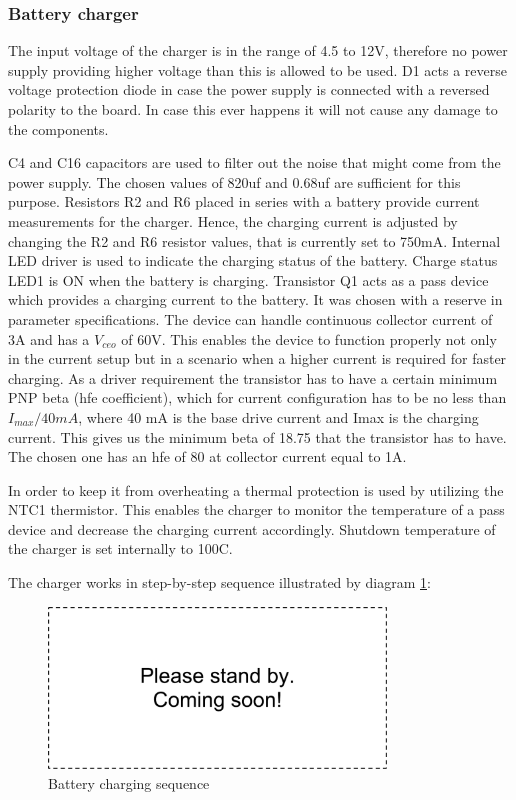 \subsubsection{Battery charger}
The input voltage of the charger is in the range of 4.5 to 12V, therefore no power supply providing higher voltage than this is allowed to be used. D1 acts a reverse voltage protection diode in case the power supply is connected with a reversed polarity to the board. In case this ever happens it will not cause any damage to the components. 


C4 and C16 capacitors are used to filter out the noise that might come from the power supply. The chosen values of 820uf and 0.68uf are sufficient for this purpose. Resistors R2 and R6 placed in series with a battery provide current measurements for the charger. Hence, the charging current is adjusted by changing the R2 and R6 resistor values, that is currently set to 750mA. Internal LED driver is used to indicate the charging status of the battery. Charge status LED1 is ON when the battery is charging. Transistor Q1 acts as a pass device which provides a charging current to the battery. It was chosen with a reserve in parameter specifications. The device can handle continuous collector current of 3A and has a $V_{ceo}$ of 60V. This enables the device to function properly not only in the current setup but in a scenario when a higher current is required for faster charging. As a driver requirement the transistor has to have a certain minimum PNP beta (hfe coefficient), which for current configuration has to be no less than $I_{max} / 40mA $, where 40 mA is the base drive current and Imax is the charging current. This gives us the minimum beta of 18.75 that the transistor has to have. The chosen one has an hfe of 80 at collector current equal to 1A. 

In order to keep it from overheating a thermal protection is used by utilizing the NTC1 thermistor. This enables the charger to monitor the temperature of a pass device and decrease the charging current accordingly. Shutdown temperature of the charger is set internally to 100C. 

The charger works in step-by-step sequence illustrated by diagram \ref{fig:charger_sequence}:

\begin{figure}
\centering
\includegraphics[width=0.8\textwidth]{Images/dummy}
\caption{Battery charging sequence}
\label{fig:charger_sequence}
\end{figure}

